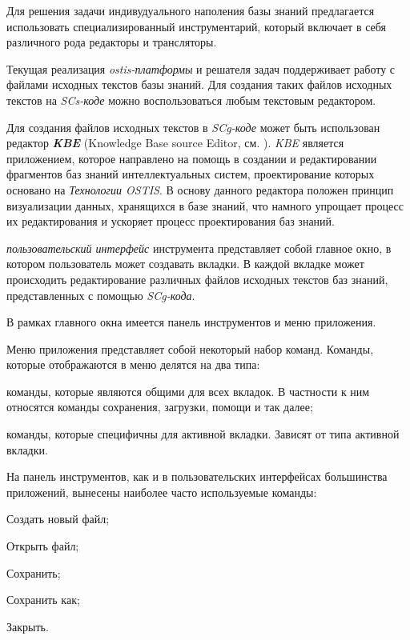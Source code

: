 Для решения задачи индивудуального наполения базы знаний предлагается использовать специализированный инструментарий, который включает в себя различного рода редакторы и трансляторы.

Текущая реализация \textit{ostis-платформы} и решателя задач поддерживает работу с файлами исходных текстов базы знаний. Для создания таких файлов исходных текстов на \textit{SCs-коде} можно воспользоваться любым текстовым редактором.

Для создания файлов исходных текстов в \textit{SCg-коде} может быть использован редактор \textbf{\textit{KBE}} (Knowledge Base source Editor, см. ). \textit{KBE} является приложением, которое направлено на помощь в создании и редактировании фрагментов баз знаний интеллектуальных систем, проектирование которых основано на \textit{Технологии OSTIS}. В основу данного редактора положен принцип визуализации данных, хранящихся в базе знаний, что намного упрощает процесс их редактирования и ускоряет процесс проектирования баз знаний.

\textit{пользовательский интерфейс} инструмента представляет собой главное окно, в котором пользователь может создавать вкладки. В каждой вкладке может происходить редактирование различных файлов исходных текстов баз знаний, представленных с помощью \textit{SCg-кода}.

В рамках главного окна имеется панель инструментов и меню приложения. 

Меню приложения представляет собой некоторый набор команд. Команды, которые отображаются в меню делятся на два типа:
\begin{textitemize}
\item команды, которые являются общими для всех вкладок. В частности к ним относятся команды сохранения, загрузки, помощи и так далее;
\item команды, которые специфичны для активной вкладки. Зависят от типа активной вкладки.
\end{textitemize}

На панель инструментов, как и в пользовательских интерфейсах большинства приложений, вынесены наиболее часто используемые команды:
\begin{textitemize}
\item Создать новый файл;
\item Открыть файл;
\item Сохранить;
\item Сохранить как;
\item Закрыть.
\end{textitemize}

